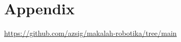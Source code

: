 \documentclass[12pt, a4paper]{article}
\begin{document}
\newpage
{} %


\newpage


\newpage


\newpage


\newpage


\newpage

\printbibliography[title={References}]

\newpage
\section*{Appendix}
\label{sec:appendix}
\begin{center}
    \url{https://github.com/azsig/makalah-robotika/tree/main}
\end{center}
\end{document}
